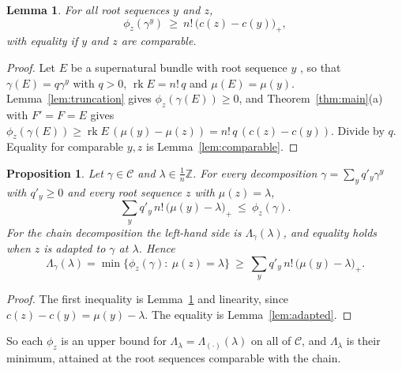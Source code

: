\documentclass[11pt]{amsart}
\newtheorem{proposition}[theorem]{Proposition}
\newtheorem{lemma}[theorem]{Lemma}
\theoremstyle{definition}
\theoremstyle{remark}
\newcommand{\ZZ}{\mathbb{Z}}
\newcommand{\CC}{\mathcal{C}}
\DeclareMathOperator{\rk}{rk}
\begin{document}
\begin{lemma}\label{lem:positivity}
For all root sequences $y$ and $z$,
\[
\phi_z(\gamma^y)\ \ge\ n!\,\big(c(z)-c(y)\big)_+ ,
\]
with equality if $y$ and $z$ are comparable.
\end{lemma}

\begin{proof}
Let $E$ be a supernatural bundle with root sequence $y$ \cite[Thm.~0.4]{ES09}, so that $\gamma(E)=q\gamma^y$ with $q>0$, $\rk E=n!\,q$ and $\mu(E)=\mu(y)$. Lemma~\ref{lem:truncation} gives $\phi_z(\gamma(E))\ge0$, and Theorem~\ref{thm:main}(a) with $F'=F=E$ gives $\phi_z(\gamma(E))\ge\rk E\,(\mu(y)-\mu(z))=n!\,q\,(c(z)-c(y))$. Divide by $q$. Equality for comparable $y,z$ is Lemma~\ref{lem:comparable}.
\end{proof}

\begin{proposition}\label{prop:minformula}
Let $\gamma\in\CC$ and $\lambda\in\frac1n\ZZ$. For every decomposition $\gamma=\sum_yq'_y\gamma^y$ with $q'_y\ge0$ and every root sequence $z$ with $\mu(z)=\lambda$,
\[
\sum_yq'_y\,n!\,\big(\mu(y)-\lambda\big)_+\ \le\ \phi_z(\gamma).
\]
For the chain decomposition the left-hand side is $\Lambda_\gamma(\lambda)$, and equality holds when $z$ is adapted to $\gamma$ at $\lambda$. Hence
\[
\Lambda_\gamma(\lambda)=\min\{\phi_z(\gamma):\ \mu(z)=\lambda\}\ \ge\ \sum_yq'_y\,n!\,\big(\mu(y)-\lambda\big)_+ .
\]
\end{proposition}

\begin{proof}
The first inequality is Lemma~\ref{lem:positivity} and linearity, since $c(z)-c(y)=\mu(y)-\lambda$. The equality is Lemma~\ref{lem:adapted}.
\end{proof}

So each $\phi_z$ is an upper bound for $\Lambda_\lambda=\Lambda_{(\cdot)}(\lambda)$ on all of $\CC$, and $\Lambda_\lambda$ is their minimum, attained at the root sequences comparable with the chain.
\end{document}
